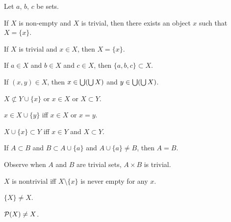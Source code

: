 \documentclass{article}
\begin{document}
Let $a$, $b$, $c$ be sets.
\begin{thm}
\item\label{zfmisc1:131} If $X$ is non-empty and $X$ is trivial, then
  there exists an object $x$ such that $X=\{x\}$.
\item\label{zfmisc1:132} If $X$ is trivial and $x\in X$, then $X=\{x\}$.
\item\label{zfmisc1:133} If $a\in X$ and $b\in X$ and $c\in X$, then
  $\{a,b,c\}\subset X$.
\item\label{zfmisc1:134} If $(x,y)\in X$, then $x\in\bigcup(\bigcup X)$
  and $y\in\bigcup(\bigcup X)$.
\item\label{zfmisc1:135} $X\nsubset Y\cup\{x\}$ or $x\in X$ or $X\subset Y$.
\item\label{zfmisc1:136} $x\in X\cup\{y\}$ iff $x\in X$ or $x=y$.
\item\label{zfmisc1:137} $X\cup\{x\}\subset Y$ iff $x\in Y$ and
  $X\subset Y$.
\item\label{zfmisc1:138} If $A\subset B$ and $B\subset A\cup\{a\}$ and
  $A\cup\{a\}\neq B$, then $A=B$.
\end{thm}

Observe when $A$ and $B$ are trivial sets, $A\times B$ is trivial.

\begin{thm}
\item\label{zfmisc1:139} $X$ is nontrivial iff $X\setminus\{x\}$ is
  never empty for any $x$.
\item\label{zfmisc1:140} $\{X\}\neq X$.
\item\label{zfmisc1:141} $\mathcal{P}(X)\neq X$.
\end{thm}
\end{document}
